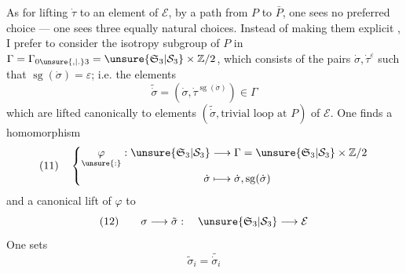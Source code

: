 As for lifting $\dot\tau$ to an element of $\mathcal E$, by a path from $P$ to $\bar P$, one sees no preferred choice --- one sees three equally natural choices. Instead of making them explicit , I prefer to consider the isotropy subgroup of $P$ in $\Gamma=\Gamma_{0\unsure{,|.}3}=\unsure{\mathfrak S_3|\mathcal S_3}\times\mathbb Z/2$, which consists of the pairs $\dot\sigma,\dot\tau^\varepsilon$ such that $\operatorname{sg}(\dot\sigma)=\varepsilon$;  i.e. the elements
\[
\widetilde{\dot\sigma}=(\dot\sigma,\dot\tau^{\operatorname{sg}(\dot\sigma)})\in\Gamma
\]
which are lifted canonically to elements $(\widetilde{\dot\sigma},\text{trivial loop at }P)$ of $\mathcal E$. One finds a homomorphism
\[
(11)\quad\left\{\begin{aligned}
\underset{\unsure{:}}{\varphi}:\unsure{\mathfrak S_3|\mathcal S_3}&\longrightarrow\Gamma=\unsure{\mathfrak S_3|\mathcal S_3}\times\mathbb Z/2\\
\dot\sigma&\longmapsto\dot\sigma,\operatorname{sg}(\dot\sigma)
\end{aligned}\right.
\]
and a canonical lift of $\varphi$ to
\[
(12)\qquad\sigma\longrightarrow\tilde\sigma:\quad\unsure{\mathfrak S_3|\mathcal S_3}\longrightarrow\mathcal E
\]
One sets
\[
\tilde\sigma_i=\widetilde{\dot\sigma_i}
\]
